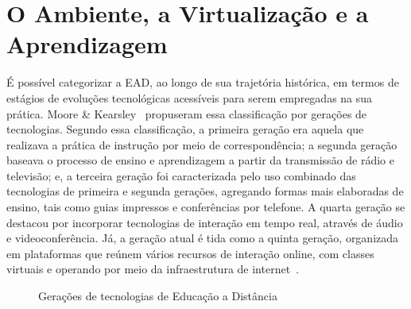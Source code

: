 \section{O Ambiente, a Virtualização e a Aprendizagem}%

É possível categorizar a EAD, ao longo de sua trajetória histórica, em termos de estágios de evoluções tecnológicas acessíveis para serem empregadas na sua prática. Moore \& Kearsley~\cite{moore2007} propuseram essa classificação por gerações de tecnologias. Segundo essa classificação, a primeira geração era aquela que realizava a prática de instrução por meio de correspondência; a segunda geração baseava o processo de ensino e aprendizagem a partir da transmissão de rádio e televisão; e, a terceira geração foi caracterizada pelo uso combinado das tecnologias de primeira e segunda gerações, agregando formas mais elaboradas de ensino, tais como guias impressos e conferências por telefone. A quarta geração se destacou por incorporar tecnologias de interação em tempo real, através de áudio e videoconferência. Já, a geração atual é tida como a quinta geração, organizada em plataformas que reúnem vários recursos de interação online, com classes virtuais e operando por meio da infraestrutura de internet~\cite{dotta@ead}. 

\begin{figure}[ht]
    \centering
    \caption{Gerações de tecnologias de Educação a Distância}
    \vspace{2mm}
    \label{fig:geracao}
    \vspace{2mm}
\end{figure}      
  
